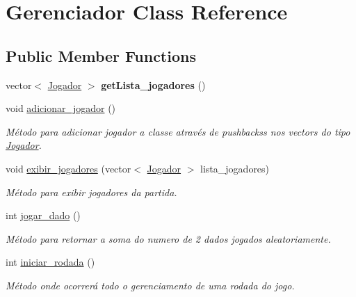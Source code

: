 \hypertarget{classGerenciador}{}\section{Gerenciador Class Reference}
\label{classGerenciador}
\subsection*{Public Member Functions}
\begin{DoxyCompactItemize}
\item 
\mbox{\label{classGerenciador_a4fd3c33fb6c255fe06dc4105f816c67b}} 
vector$<$ \hyperlink{classJogador}{Jogador} $>$ {\bfseries get\+Lista\+\_\+jogadores} ()
\item 
\mbox{\label{classGerenciador_a3fec9b86d4da034d06d60bb06d862819}} 
void \hyperlink{classGerenciador_a3fec9b86d4da034d06d60bb06d862819}{adicionar\+\_\+jogador} ()
\begin{DoxyCompactList}\small\item\em Método para adicionar jogador a classe através de pushbacks\textquotesingle{}s nos vector\textquotesingle{}s do tipo \hyperlink{classJogador}{Jogador}. \end{DoxyCompactList}\item 
void \hyperlink{classGerenciador_ae26e87727d35b71dd43db8be0dbc77d2}{exibir\+\_\+jogadores} (vector$<$ \hyperlink{classJogador}{Jogador} $>$ lista\+\_\+jogadores)
\begin{DoxyCompactList}\small\item\em Método para exibir jogadores da partida. \end{DoxyCompactList}\item 
int \hyperlink{classGerenciador_afb1df83365cd8c225af375087aaff983}{jogar\+\_\+dado} ()
\begin{DoxyCompactList}\small\item\em Método para retornar a soma do numero de 2 dados jogados aleatoriamente. \end{DoxyCompactList}\item 
int \hyperlink{classGerenciador_a25a8afd36fd5a56265d50ce47be5c59e}{iniciar\+\_\+rodada} ()
\begin{DoxyCompactList}\small\item\em Método onde ocorrerá todo o gerenciamento de uma rodada do jogo. \end{DoxyCompactList}\end{DoxyCompactItemize}


